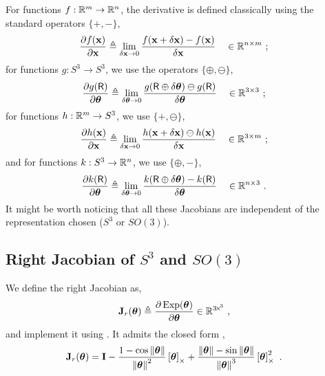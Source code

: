 For functions $f:{\mathbb R}^m\to{\mathbb R}^n$, the derivative is defined classically using the standard operators $\{+,-\}$,
%
\begin{align}\label{equ:derivative_vector}
\frac{\partial f({\bf x})}{\partial{\bf x}} &\triangleq \lim_{\delta{\bf x}\to0}\frac{f({\bf x}+\delta{\bf x})-f({\bf x})}{\delta{\bf x}} &&\in {\mathbb R}^{n\times m} 
~;
\end{align}
%
for functions $g:S^3\to S^3$, we use the operators $\{\oplus,\ominus\}$,
%
\begin{align}\label{equ:derivative_SO3}
\frac{\partial g(\mathsf R)}{\partial{{\bm \theta}}} 
&\triangleq \lim_{\delta{{\bm \theta}}\to0}\frac{g(\mathsf R\oplus\delta{{\bm \theta}})\ominus g(\mathsf R)}{\delta{{\bm \theta}}}  && \in {\mathbb R}^{3\times 3}
~;
\end{align}
%
for functions $h:{\mathbb R}^m \to S^3$, we use $\{+,\ominus\}$,
%
\begin{align}\label{equ:dif_RtoSO3}
\frac{\partial h({\bf x})}{\partial{\bf x}} &\triangleq \lim_{\delta{\bf x}\to0} \frac{ h({\bf x}+\delta{\bf x})\ominus h({\bf x})}{\delta{\bf x}} && \in {\mathbb R}^{3\times m} 
~;
\end{align}
%
and for functions $k:S^3\to{\mathbb R}^n$, we use $\{\oplus,-\}$,
%
\begin{align}\label{equ:jacobian_SO3_Rn}
\frac{\partial k(\mathsf R)}{\partial{{\bm \theta}}} &\triangleq \lim_{\delta{{\bm \theta}}\to0} \frac{k(\mathsf R\oplus\delta{{\bm \theta}}) - k(\mathsf R)}{\delta{{\bm \theta}}} && \in {\mathbb R}^{n\times 3} 
~.
\end{align}
%
It might be worth noticing that all these Jacobians are independent of the representation chosen ($S^3$ or $SO(3)$).


\subsection{Right Jacobian of $S^3$ and $SO(3)$}

We define the right Jacobian as, 
%
\begin{align}\label{equ:Jr}
{\bf J}_r({{\bm \theta}}) &\triangleq \frac{\partial\operatorname*{Exp}({{\bm \theta}})}{\partial{{\bm \theta}}} 
\in{\mathbb R}^{3\!\times\!^3}
~,
\end{align}
%
and implement it using .
It admits the closed form  \cite[pag.~40]{CHIRIKJIAN-12}, 
%
\begin{align}
{\bf J}_r({{\bm \theta}}) &= {\bf I} - \frac{1-\cos{\left\|{{\bm \theta}}\right\|}}{{\left\|{{\bm \theta}}\right\|}^2}\left[{{\bm \theta}}\right]_\times + \frac{{\left\|{{\bm \theta}}\right\|}-\sin{\left\|{{\bm \theta}}\right\|}}{{\left\|{{\bm \theta}}\right\|}^3}\left[{{\bm \theta}}\right]_\times^2 
~.
\end{align}



